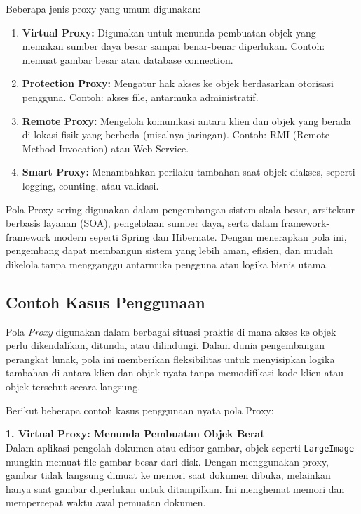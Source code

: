 Beberapa jenis proxy yang umum digunakan:
\begin{enumerate}
	\item \textbf{Virtual Proxy:} Digunakan untuk menunda pembuatan objek yang memakan sumber daya besar sampai benar-benar diperlukan. Contoh: memuat gambar besar atau database connection.
	\item \textbf{Protection Proxy:} Mengatur hak akses ke objek berdasarkan otorisasi pengguna. Contoh: akses file, antarmuka administratif.
	\item \textbf{Remote Proxy:} Mengelola komunikasi antara klien dan objek yang berada di lokasi fisik yang berbeda (misalnya jaringan). Contoh: RMI (Remote Method Invocation) atau Web Service.
	\item \textbf{Smart Proxy:} Menambahkan perilaku tambahan saat objek diakses, seperti logging, counting, atau validasi.
\end{enumerate}

Pola Proxy sering digunakan dalam pengembangan sistem skala besar, arsitektur berbasis layanan (SOA), pengelolaan sumber daya, serta dalam framework-framework modern seperti Spring dan Hibernate. Dengan menerapkan pola ini, pengembang dapat membangun sistem yang lebih aman, efisien, dan mudah dikelola tanpa mengganggu antarmuka pengguna atau logika bisnis utama.


\subsection{Contoh Kasus Penggunaan}

Pola \textit{Proxy} digunakan dalam berbagai situasi praktis di mana akses ke objek perlu dikendalikan, ditunda, atau dilindungi. Dalam dunia pengembangan perangkat lunak, pola ini memberikan fleksibilitas untuk menyisipkan logika tambahan di antara klien dan objek nyata tanpa memodifikasi kode klien atau objek tersebut secara langsung.

Berikut beberapa contoh kasus penggunaan nyata pola Proxy:

\textbf{1. Virtual Proxy: Menunda Pembuatan Objek Berat} \\
Dalam aplikasi pengolah dokumen atau editor gambar, objek seperti \texttt{LargeImage} mungkin memuat file gambar besar dari disk. Dengan menggunakan proxy, gambar tidak langsung dimuat ke memori saat dokumen dibuka, melainkan hanya saat gambar diperlukan untuk ditampilkan. Ini menghemat memori dan mempercepat waktu awal pemuatan dokumen.

